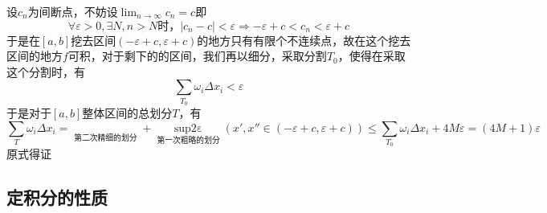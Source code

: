 \documentclass[lang=cn,10pt]{elegantbook}
\begin{document}
\begin{solution}
	
	设$c_n $为间断点，不妨设$\lim_{n\rightarrow \infty} c_n=c$即
	\begin{equation*}
		\forall \varepsilon >0,\exists N,n>N\text{时，}|c_n-c|<\varepsilon \Longrightarrow -\varepsilon +c<c_n<\varepsilon +c
	\end{equation*}
	于是在$[a,b]$挖去区间$(-\varepsilon +c,\varepsilon +c)$的地方只有有限个不连续点，故在这个挖去区间的地方$f$可积，对于剩下的的区间，我们再以细分，采取分割$T_{0}$，使得在采取这个分割时，有
	\begin{equation*}
		\sum_{T_0}{\omega _i\varDelta x_i}<\varepsilon 
	\end{equation*}
	于是对于$[a,b]$整体区间的总划分$T$，有
	\begin{equation*}
		\sum_T{\omega _i\varDelta x_i}=\mathop {\sum_{T_0}{\omega _i\varDelta x_i}} \limits_{\text{第二次精细的划分}}+\mathop {\mathrm{sup}|f\left( x\prime \right) -f\left( x'' \right) |2\varepsilon} \limits_{\text{第一次粗略的划分}}\left( x\prime,x''\in (-\varepsilon +c,\varepsilon +c) \right) \le \sum_{T_0}{\omega _i\varDelta x_i}+4M\varepsilon =(4M+1)\varepsilon 	
	\end{equation*}
	原式得证
\end{solution}
\subsection{定积分的性质}
\end{document}
